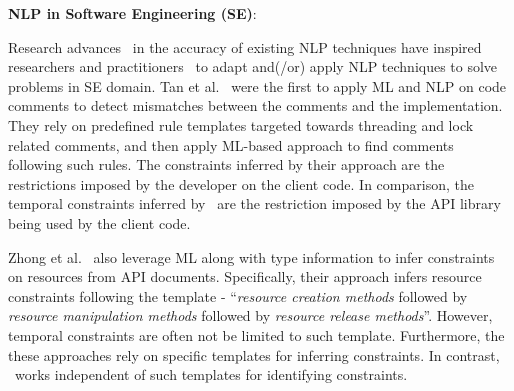 \textbf{NLP in Software Engineering (SE)}:

Research advances~\cite{Marneffe08COLING,KleinNIPS03} in the accuracy of existing NLP techniques have inspired researchers and practitioners~\cite{pandita12:inferring, pandita13:WHYPER, johnSlankasPASSAT13, XiaoFSE2012, thummalapentaICSE12} to adapt and(/or) apply NLP techniques to solve problems in SE domain. 
Tan et al.~\cite{TanSOSP07} were the first to apply ML and NLP on code comments to detect mismatches between the comments and the implementation.
They rely on predefined rule templates targeted towards threading and lock related comments, and then apply ML-based approach to find comments following such rules.
The constraints inferred by their approach are the restrictions imposed by the developer on the client code.
In comparison, the temporal constraints inferred by \tool\ are the restriction imposed by the API library being used by the client code.

Zhong et al.~\cite{zhong09SE} also leverage ML along with type information to infer constraints on resources from API documents.
Specifically, their approach infers resource constraints following the template - ``\textit{resource creation methods} followed by \textit{resource manipulation methods} followed by \textit{resource release methods}''.
However, temporal constraints are often not be limited to such template. 
Furthermore, the these approaches rely on specific templates for inferring constraints. In contrast, \tool\ works independent of such templates for identifying constraints.



